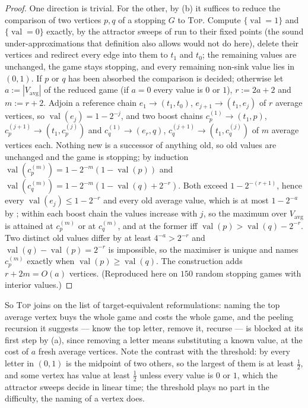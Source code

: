 \documentclass[11pt]{article}
\theoremstyle{plain}
\theoremstyle{definition}
\DeclareMathOperator{\val}{val}
\newcommand{\Vavg}{V_{\mathrm{avg}}}
\begin{document}
\begin{proof}
One direction is trivial. For the other, by (b) it
suffices to reduce the comparison of two vertices $p,q$ of a stopping $G$
to \textsc{Top}. Compute $\{\val=1\}$ and $\{\val=0\}$ exactly, by the
attractor sweeps of  run to their fixed points (the
sound under-approximations that definition also allows would not do
here), delete their vertices and redirect every
edge into them to $t_1$ and $t_0$; the remaining values are unchanged,
the game stays stopping, and every remaining non-sink value lies in
$(0,1)$. If $p$ or $q$ has been absorbed the
comparison is decided; otherwise let $a:=|\Vavg|$ of the reduced game
(if $a=0$ every value is $0$ or $1$), $r:=2a+2$ and $m:=r+2$. Adjoin a
reference chain $e_1\to(t_1,t_0)$, $e_{j+1}\to(t_1,e_j)$ of $r$ average
vertices, so $\val(e_j)=1-2^{-j}$, and two boost chains
$c^{(1)}_p\to(t_1,p)$, $c^{(j+1)}_p\to(t_1,c^{(j)}_p)$ and
$c^{(1)}_q\to(e_r,q)$, $c^{(j+1)}_q\to(t_1,c^{(j)}_q)$ of $m$ average
vertices each. Nothing new is a successor of anything old, so old values
are unchanged and the game is stopping; by induction
$\val(c^{(m)}_p)=1-2^{-m}(1-\val(p))$ and
$\val(c^{(m)}_q)=1-2^{-m}(1-\val(q)+2^{-r})$. Both exceed
$1-2^{-(r+1)}$, hence every $\val(e_j)\le1-2^{-r}$ and every old average
value, which is at most $1-2^{-a}$ by ; within
each boost chain the values increase with $j$, so the maximum over
$\Vavg$ is attained at $c^{(m)}_p$ or at $c^{(m)}_q$, and at the former
iff $\val(p)>\val(q)-2^{-r}$. Two distinct old values differ by at least
$4^{-a}>2^{-r}$ and $\val(q)-\val(p)=2^{-r}$ is impossible, so the
maximiser is unique and names $c^{(m)}_p$ exactly when
$\val(p)\ge\val(q)$. The construction adds $r+2m=O(a)$ vertices.
(Reproduced here on $150$ random stopping games with interior values.)
\end{proof}

So \textsc{Top} joins 
on the list of target-equivalent reformulations: naming the top average
vertex buys the whole game and costs the whole game, and the peeling
recursion it suggests --- know the top letter, remove it, recurse --- is
blocked at its first step by (a), since removing a
letter means substituting a known value, at the cost of $a$ fresh
average vertices. Note the contrast with the threshold: by
 every letter in $(0,1)$ is the midpoint of two
others, so the largest of them is at least $\tfrac12$, and some vertex
has value at least $\tfrac12$ unless every value is $0$ or $1$, which
the attractor sweeps decide in linear time; the threshold plays no part
in the difficulty, the naming of a vertex does.
\end{document}
